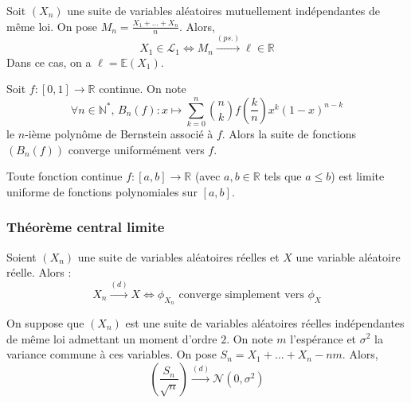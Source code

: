
  \begin{theorem}
    Soit $(X_n)$ une suite de variables aléatoires mutuellement indépendantes de même loi. On pose $M_n = \frac{X_1 + \dots + X_n}{n}$. Alors,
    \[ X_1 \in \mathcal{L}_1 \iff M_n \overset{(ps.)}{\longrightarrow} \ell \in \mathbb{R} \]
    Dans ce cas, on a $\ell = \mathbb{E}(X_1)$.
  \end{theorem}


  \begin{application}
    Soit $f : [0,1] \rightarrow \mathbb{R}$ continue. On note
    \[ \forall n \in \mathbb{N}^*, \, B_n(f) : x \mapsto \sum_{k=0}^n \binom{n}{k} f \left( \frac{k}{n} \right) x^k (1-x)^{n-k} \]
    le $n$-ième polynôme de Bernstein associé à $f$. Alors la suite de fonctions $(B_n(f))$ converge uniformément vers $f$.
  \end{application}


  \begin{corollary}
    Toute fonction continue $f : [a,b] \rightarrow \mathbb{R}$ (avec $a, b \in \mathbb{R}$ tels que $a \leq b$) est limite uniforme de fonctions polynomiales sur $[a, b]$.
  \end{corollary}

  \subsubsection{Théorème central limite}


  \begin{theorem}
    \label{theoreme-central-limite-1}
    Soient $(X_n)$ une suite de variables aléatoires réelles et $X$ une variable aléatoire réelle. Alors :
    \[ X_n \overset{(d)}{\longrightarrow} X \iff \phi_{X_n} \text{ converge simplement vers } \phi_X \]
  \end{theorem}


  \begin{theorem}
    On suppose que $(X_n)$ est une suite de variables aléatoires réelles indépendantes de même loi admettant un moment d'ordre $2$. On note $m$ l'espérance et $\sigma^2$ la variance commune à ces variables. On pose $S_n = X_1 + \dots + X_n - nm$. Alors,
    \[ \left ( \frac{S_n}{\sqrt{n}} \right) \overset{(d)}{\longrightarrow} \mathcal{N}(0, \sigma^2) \]
  \end{theorem}

